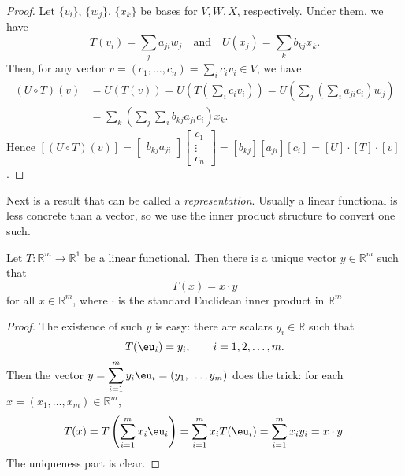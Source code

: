 \documentclass[11pt]{article}
\begin{document}
\begin{proof}
  Let $\{ v_i \}$, $\{ w_j \}$, $\{ x_k \}$ be bases for $V, W, X$, respectively.
  Under them, we have
  \[
    T(v_i) = \sum_j a_{ji} w_j \quad \text{and} \quad
    U(x_j) = \sum_k b_{kj} x_k.
  \]
  Then, for any vector $v = (c_1, \dots, c_n) = \sum_i c_i v_i \in V$, we have
  \begin{align*}
    (U \circ T)(v) &= U(T(v)) = U\left( T\left( \sum_i c_i v_i \right) \right) 
    = U \left( \sum_j \left( \sum_i a_{ji} c_i \right) w_j \right) \\
  &= \sum_k \left( \sum_j \sum_i b_{kj} a_{ji} c_i \right) x_k. \end{align*}
    Hence $\displaystyle 
      [(U\circ T)(v)] = 
    \begin{bmatrix}
      b_{kj} a_{ji}
    \end{bmatrix}
    \begin{bmatrix}
      c_1 \\ \vdots \\ c_n
    \end{bmatrix} = [b_{kj}] [a_{ji}] [c_i] = [U] \cdot [T] \cdot [v]$.
\end{proof}

Next is a result that can be called a \textit{representation}.
Usually a linear functional is less concrete than a vector, so we use the inner product structure to convert one such.

\begin{thm}
  Let $T : \mathbb{R}^m \to \mathbb{R}^1$ be a linear functional.
  Then there is a unique vector $y \in \mathbb{R}^m$ such that
  \[
    T(x) = x \cdot y
  \]
  for all $x \in \mathbb{R}^m$, where $\cdot$ is the standard Euclidean inner product in $\mathbb{R}^m$.
\end{thm}

\begin{proof}
  The existence of such $y$ is easy: there are scalars $y_i \in \mathbb{R}$ such that
  \[
    T(\eu_i) = y_i, \qquad i = 1, 2, \dots, m.
  \]
  Then the vector $\displaystyle y = \sum_{i=1}^m y_i \eu_i = (y_1, \dots, y_m)$ does the trick: for each $x = (x_1, \dots, x_m) \in \mathbb{R}^m$,
  \[
    T(x) = T \left( \sum_{i=1}^m x_i \eu_i \right) = \sum_{i=1}^m x_i T(\eu_i) = \sum_{i=1}^m x_i y_i = x \cdot y.
  \]
  The uniqueness part is clear.
\end{proof}
\end{document}
